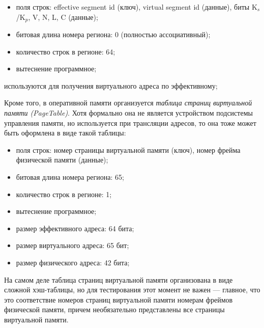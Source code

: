 \begin{itemize}
\begin{itemize}
            \item поля строк: effective segment id (ключ), virtual segment id
(данные), биты K$_s$/K$_p$, V, N, L, C (данные);
            \item битовая длина номера региона: 0 (полностью ассоциативный);
            \item количество строк в регионе: 64;
            \item вытеснение программное;
        \end{itemize}
        используются для получения виртуального адреса по эффективному;
\end{itemize}

Кроме того, в оперативной памяти организуется \emph{таблица страниц виртуальной памяти (PageTable)}. Хотя формально она не является устройством подсистемы управления памяти, но используется при трансляции адресов, то она тоже может быть оформлена в виде такой таблицы:
    \begin{itemize}
        \item поля строк: номер страницы виртуальной памяти (ключ), номер фрейма
физической памяти (данные);
        \item битовая длина номера региона: 65;
        \item количество строк в регионе: 1;
        \item вытеснение программное;
        \item размер эффективного адреса: 64 бита;
        \item размер виртуального адреса: 65 бит;
        \item размер физического адреса: 42 бита;
    \end{itemize}

На самом деле таблица страниц виртуальной памяти организована в виде сложной
хэш-таблицы, но для тестирования этот момент не важен --- главное, что это
соответствие номеров страниц виртуальной памяти номерам фреймов физической
памяти, причем необязательно представлены все страницы виртуальной памяти.

